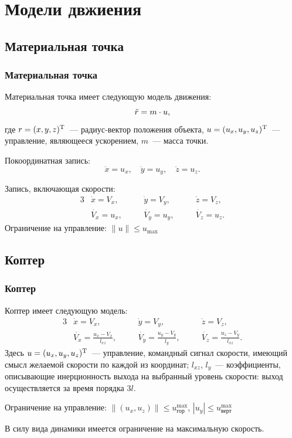 \documentclass[10pt,t]{beamer}
\begin{document}
\section[Модели движения]{Модели двжиения}
\subsection[Материальная точка]{Материальная точка}
\begin{frame}
\frametitle{Материальная точка}
\small

Материальная точка имеет следующую модель движения:
\begin{equation*}
    \Ddot{r} = m \cdot u,
\end{equation*}
где $r = (x, y, z)^\text{\textup{T}}$~--- радиус-вектор положения объекта, $u = (u_x, u_y, u_z)^\text{\textup{T}}$~--- управление, являющееся ускорением, $m$~--- масса точки.

Покоординатная запись:
\begin{equation*}
  \ddot{x} = u_x, \quad \ddot{y} = u_y, \quad \ddot{z} = u_z.
\end{equation*}

Запись, включающая скорости:
\begin{alignat*}{3}
  & \dot{x} = V_x,  & \quad & \dot{y} = V_y, & \quad & \dot{z} = V_z, \\
  & \dot{V_x} = u_x, & & \dot{V_y} = u_y, & & \dot{V_z} = u_z.
\end{alignat*}
Ограничение на управление: $\|u\| \leqslant u_{\max}$

\end{frame}

\subsection[Коптер]{Коптер}
\begin{frame}
\frametitle{Коптер}
\small

Коптер имеет следующую модель:
\begin{alignat*}{3}
  & \dot{x} = V_x, & \quad & \dot{y} = V_y, & \quad
    & \dot{z} = V_z, \\
  & \displaystyle
    \dot{V_x} = \frac{u_x - V_x}{l_{xz}},  & &
    \dot{V_y} = \frac{u_y - V_y}{l_{y}},   & &
    \dot{V_z} = \frac{u_z - V_y}{l_{xz}}.
\end{alignat*}
Здесь $u = (u_x, u_y, u_z)^\text{\textup{T}}$~--- управление, командный сигнал скорости, имеющий смысл желаемой скорости по каждой из координат; $l_{xz}$, $l_y$~--- коэффициенты, описывающие инерционность выхода на выбранный уровень скорости: выход осуществляется за время порядка $3l$. 

Ограничение на управление: $\|(u_x,u_z)\| \leqslant u^{\max}_\text{гор}$, $|u_y| \leqslant u^{\max}_\text{верт}$

В силу вида динамики имеется ограничение на максимальную скорость.

\end{frame}
\end{document}
